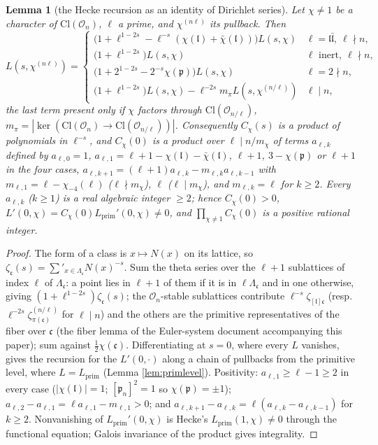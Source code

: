 \documentclass[11pt]{amsart}
\numberwithin{equation}{section}
\theoremstyle{plain}
\newtheorem{lemma}[theorem]{Lemma}
\theoremstyle{definition}
\theoremstyle{remark}
\newcommand{\Cl}{\mathrm{Cl}}
\newcommand{\idealc}{\mathfrak{c}}
\newcommand{\idealp}{\mathfrak{p}}
\newcommand{\Lprim}{L_{\mathrm{prim}}}
\newcommand{\Oc}{\mathcal{O}}
\begin{document}
\begin{lemma}[the Hecke recursion as an identity of Dirichlet series]
\label{lem:diricrec}
Let $\chi \ne 1$ be a character of $\Cl(\Oc_n)$, $\ell$ a prime, and
$\chi^{(n\ell)}$ its pullback.  Then
\[
  L(s,\chi^{(n\ell)}) =
  \begin{cases}
  \bigl(1 + \ell^{1-2s} - \ell^{-s}(\chi(\mathfrak l)+\bar\chi(\mathfrak l))\bigr)L(s,\chi)
  & \ell = \mathfrak l\bar{\mathfrak l},\ \ell\nmid n,\\
  \bigl(1 + \ell^{1-2s}\bigr)L(s,\chi) & \ell \text{ inert},\ \ell\nmid n,\\
  \bigl(1 + 2^{1-2s} - 2^{-s}\chi(\idealp)\bigr)L(s,\chi) & \ell = 2\nmid n,\\
  \bigl(1 + \ell^{1-2s}\bigr)L(s,\chi) - \ell^{-2s}m_\pi L(s,\chi^{(n/\ell)}) & \ell\mid n,
  \end{cases}
\]
the last term present only if $\chi$ factors through $\Cl(\Oc_{n/\ell})$,
$m_\pi = |\ker(\Cl(\Oc_n)\to\Cl(\Oc_{n/\ell}))|$.  Consequently
$C_\chi(s)$ is a product of polynomials in $\ell^{-s}$, and $C_\chi(0)$ is
a product over $\ell \mid n/m_\chi$ of terms $a_{\ell,k}$ defined by
$a_{\ell,0} = 1$, $a_{\ell,1} = \ell+1-\chi(\mathfrak l)-\bar\chi(\mathfrak l)$,
$\ell + 1$, $3 - \chi(\idealp)$ or $\ell+1$ in the four cases,
$a_{\ell,k+1} = (\ell+1)a_{\ell,k} - m_{\ell,k}a_{\ell,k-1}$ with
$m_{\ell,1} = \ell - \chi_{-4}(\ell)$ ($\ell\nmid m_\chi$), $\ell$
($\ell\mid m_\chi$), and $m_{\ell,k} = \ell$ for $k \ge 2$.  Every
$a_{\ell,k}$ ($k \ge 1$) is a real algebraic integer $\ge 2$; hence
$C_\chi(0) > 0$, $L'(0,\chi) = C_\chi(0)\Lprim'(0,\chi) \ne 0$, and
$\prod_{\chi\ne1}C_\chi(0)$ is a positive rational integer.
\end{lemma}

\begin{proof}
The form of a class is $x \mapsto N(x)$ on its lattice, so
$\zeta_\idealc(s) = \sum'_{x\in\Lambda_\idealc}N(x)^{-s}$.  Sum the theta
series over the $\ell+1$ sublattices of index $\ell$ of $\Lambda_\idealc$:
a point lies in $\ell + 1$ of them if it is in $\ell\Lambda_\idealc$ and in
one otherwise, giving $(1 + \ell^{1-2s})\zeta_\idealc(s)$; the
$\Oc_n$-stable sublattices contribute $\ell^{-s}\zeta_{[\mathfrak l]\idealc}$
(resp.\ $\ell^{-2s}\zeta^{(n/\ell)}_{\pi(\idealc)}$ for $\ell\mid n$) and
the others are the primitive representatives of the fiber over $\idealc$
(the fiber lemma of the Euler-system document accompanying this paper);
sum against $\tfrac12\chi(\idealc)$.  Differentiating at $s = 0$, where
every $L$ vanishes, gives the recursion for the $L'(0,\cdot)$ along a
chain of pullbacks from the primitive level, where $L = \Lprim$ (Lemma
\ref{lem:primlevel}).  Positivity: $a_{\ell,1} \ge \ell - 1 \ge 2$ in every
case ($|\chi(\mathfrak l)| = 1$; $[\idealp_n]^2 = 1$ so $\chi(\idealp) = \pm1$);
$a_{\ell,2} - a_{\ell,1} = \ell a_{\ell,1} - m_{\ell,1} > 0$; and
$a_{\ell,k+1} - a_{\ell,k} = \ell(a_{\ell,k} - a_{\ell,k-1})$ for $k \ge 2$.
Nonvanishing of $\Lprim'(0,\chi)$ is Hecke's $\Lprim(1,\chi) \ne 0$ through
the functional equation; Galois invariance of the product gives
integrality.
\end{proof}
\end{document}
